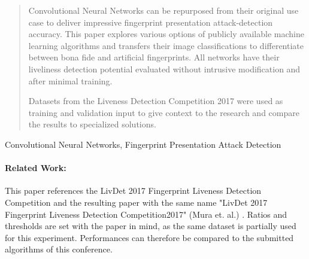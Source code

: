 
\begin{abstract}
Convolutional Neural Networks can be repurposed from their original use case to deliver impressive fingerprint presentation attack-detection accuracy.
This paper explores various options of publicly available machine learning algorithms and transfers their image classifications to differentiate between bona fide and artificial fingerprints.
All networks have their liveliness detection potential evaluated without intrusive modification and after minimal training.

Datasets from the Liveness Detection Competition 2017 were used as training and validation input to give context to the research and compare the results to specialized solutions.
\end{abstract}


\begin{keywords}
Convolutional Neural Networks, Fingerprint Presentation Attack Detection
\end{keywords}


\paragraph{Related Work:}
This paper references the LivDet 2017 Fingerprint Liveness Detection Competition and the resulting paper with the same name "LivDet 2017 Fingerprint Liveness Detection Competition2017" (Mura et. al.) \cite{LIVDET}.
Ratios and thresholds are set with the paper in mind, as the same dataset is partially used for this experiment.
Performances can therefore be compared to the submitted algorithms of this conference.





